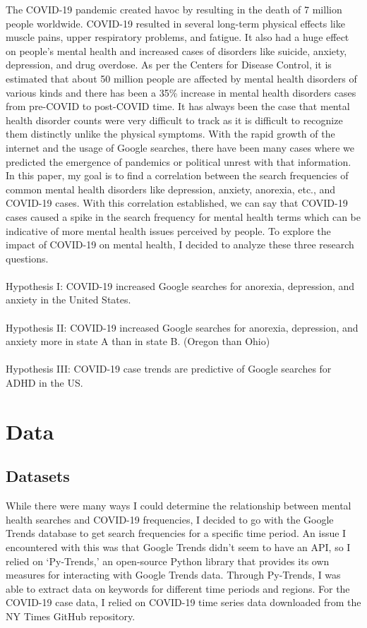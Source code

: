 \documentclass{article}
\begin{document}
The COVID-19 pandemic created havoc by resulting in the death of 7 million people worldwide.
COVID-19 resulted in several long-term physical effects like muscle pains, upper respiratory problems,
and fatigue. It also had a huge effect on people’s mental health and increased cases of disorders like
suicide, anxiety, depression, and drug overdose. As per the Centers for Disease Control, it is
estimated that about 50 million people are affected by mental health disorders of various kinds and
there has been a 35\% increase in mental health disorders cases from pre-COVID to post-COVID time.
It has always been the case that mental health disorder counts were very difficult to track as it is
difficult to recognize them distinctly unlike the physical symptoms.
With the rapid growth of the internet and the usage of Google searches, there have been many cases
where we predicted the emergence of pandemics or political unrest with that information. In this paper,
my goal is to find a correlation between the search frequencies of common mental health disorders
like depression, anxiety, anorexia, etc., and COVID-19 cases. With this correlation established, we can
say that COVID-19 cases caused a spike in the search frequency for mental health terms which can
be indicative of more mental health issues perceived by people.
To explore the impact of COVID-19 on mental health, I decided to analyze these three research
questions.
\\
\\Hypothesis I: COVID-19 increased Google searches for anorexia, depression, and anxiety in the
United States.
\\
\\Hypothesis II: COVID-19 increased Google searches for anorexia, depression, and anxiety more
in state A than in state B. (Oregon than Ohio)
\\
\\Hypothesis III: COVID-19 case trends are predictive of Google searches for ADHD in the US.

\section{Data}

\subsection{Datasets}

While there were many ways I could determine the relationship between mental health searches
and COVID-19 frequencies, I decided to go with the Google Trends database to get search
frequencies for a specific time period. An issue I encountered with this was that Google Trends
didn’t seem to have an API, so I relied on ‘Py-Trends,’ an open-source Python library that
provides its own measures for interacting with Google Trends data. Through Py-Trends, I was
able to extract data on keywords for different time periods and regions. For the COVID-19 case
data, I relied on COVID-19 time series data downloaded from the NY Times GitHub repository.
\end{document}
